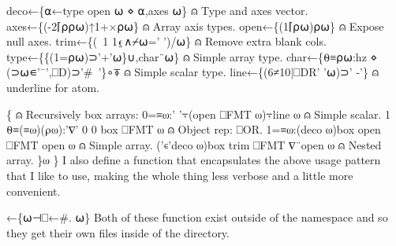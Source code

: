 \documentclass{article}%
\begin{document}
        deco←\{⍺←type open ⍵ ⋄ ⍺,axes ⍵\}                           ⍝ Type and axes vector.
        axes←\{(-2⌈⍴⍴⍵)↑1+×⍴⍵\}                                                                  ⍝ Array axis types.
        open←\{(1⌈⍴⍵)⍴⍵\}                                                                                             ⍝ Expose null axes.
        trim←\{(~1 1⍷∧⌿⍵=' ')/⍵\}                                                             ⍝ Remove extra blank cols.
        type←\{\{(1=⍴⍵)⊃'+'⍵\}∪,char¨⍵\}                                     ⍝ Simple array type.
        char←\{⍬≡⍴⍵:hz ⋄ (⊃⍵∊'¯',⎕D)⊃'#~'\}∘⍕          ⍝ Simple scalar type.
        line←\{(6≠10|⎕DR' '⍵)⊃' -'\}                                            ⍝ underline for atom.

        \{                                                                                                                                                       ⍝ Recursively box arrays:
                0=≡⍵:' '⍪(open ⎕FMT ⍵)⍪line ⍵                             ⍝ Simple scalar.
                1 ⍬≡(≡⍵)(⍴⍵):'∇' 0 0 box ⎕FMT ⍵                       ⍝ Object rep: ⎕OR.
                1=≡⍵:(deco ⍵)box open ⎕FMT open ⍵             ⍝ Simple array.
                ('∊'deco ⍵)box trim ⎕FMT ∇¨open ⍵            ⍝ Nested array.
        \}⍵
\}
\eatline
{}\nwendcode{}\nwdocspar
I also define a function {\Tt{}\nwendquote} that encapsulates the above usage
pattern that I like to use, making the whole thing less verbose and
a little more convenient.

\nwenddocs{}\endmoddef\nwstartdeflinemarkup\nwenddeflinemarkup
{}←\{⍵⊣⎕←#. ⍵\}
\eatline
{}\nwendcode{}\nwdocspar
Both of these function exist outside of the {\Tt{}\nwendquote} namespace 
and so they get their own files inside of the {\Tt{}\nwendquote} directory.
\end{document}
